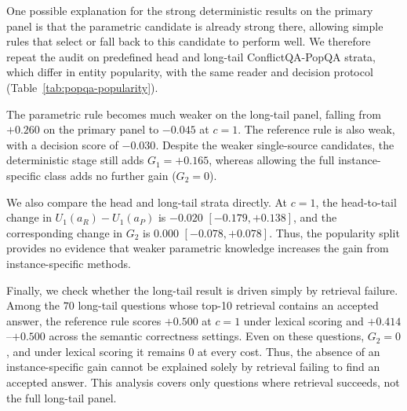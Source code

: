 \documentclass[sigconf]{acmart}
\newcommand{\ar}{a_R}
\newcommand{\ap}{a_P}
\begin{document}
One possible explanation for the strong deterministic results on the
primary panel is that the parametric candidate is already strong there,
allowing simple rules that select or fall back to this candidate to
perform well. We therefore repeat the audit on predefined head and long-tail
ConflictQA-PopQA strata, which differ in entity popularity, with the
same reader and decision protocol (Table~\ref{tab:popqa-popularity}).

The parametric rule becomes much weaker on the long-tail panel, falling
from $+0.260$ on the primary panel to $-0.045$ at $c{=}1$. The
reference rule is also weak, with a decision score of $-0.030$.
Despite the weaker single-source candidates, the deterministic stage
still adds $G_1=+0.165$, whereas allowing the full instance-specific
class adds no further gain ($G_2=0$).

We also compare the head and long-tail strata directly. At $c{=}1$,
the head-to-tail change in $U_1(\ar)-U_1(\ap)$ is $-0.020$
$[-0.179,\allowbreak +0.138]$, and the corresponding change in $G_2$
is $0.000$ $[-0.078,\allowbreak +0.078]$. 
Thus, the popularity split provides no evidence that weaker parametric
knowledge increases the gain from instance-specific methods.

Finally, we check whether the long-tail result is driven simply by
retrieval failure. Among the $70$ long-tail questions whose top-10
retrieval contains an accepted answer, the reference rule scores
$+0.500$ at $c{=}1$ under lexical scoring and
$+0.414$--$+0.500$ across the semantic correctness settings. Even on
these questions, $G_2=0$, and under lexical scoring it remains $0$ at
every cost. Thus, the absence of an instance-specific gain cannot be
explained solely by retrieval failing to find an accepted answer. 
This analysis covers only questions where retrieval succeeds, not the
full long-tail panel.
\end{document}
